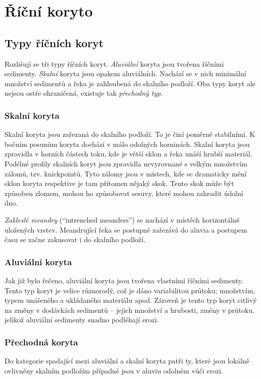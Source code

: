 \section{Říční koryto}
\subsection{Typy říčních koryt}
Rozlišují se tři typy říčních koryt. \emph{Aluviální} koryta jsou tvořena říčními sedimenty. \emph{Skalní} koryta jsou opakem aluviálních. Nachází se v nich minimální množství sedimentů a řeka je zahloubená do skalního podloží. Oba typy koryt ale nejsou ostře ohraničená, existuje tak \emph{přechodný typ}. 

\subsubsection{Skalní koryta}
Skalní koryta jsou  zařezaná do skalního podloží. To je činí poměrně stabilními. K bočním posunům koryta dochází v málo odolných horninách. Skalní koryta jsou zpravidla v horních částech toku, kde je větší sklon a řeka unáší hrubší materiál. Podélné profily skalních koryt jsou zpravidla nevyrovnané s velkým množstvím zálomů, tzv. knickpointů. Tyto zálomy jsou v místech, kde se dramaticky mění sklon koryta respektive je tam přítomen nějaký skok. Tento skok může být způsoben zlomem, mohou ho způsobovat sesuvy, které mohou zahradit údolní dno. 

\emph{Zakleslé meandry} (\enquote{intrenched meanders}) se nachází v místěch horizontálně uložených vrstev. Meandrující řeka se postupně zařezává do aluvia a postupem času se začne zakusovat i do skalního podloží. 

\subsubsection{Aluviální koryta}
Jak již bylo řečeno, aluviální koryta jsou tvořena vlastními říčními sedimenty. Tento typ koryt je velice různorodý, což je dáno variabilitou průtoku; množstvím, typem unášeného a ukládaného materiálu apod. Zároveň je tento typ koryt citlivý na změny v dodávkách sedimentů -- jejich množství a hrubosti, změny v průtoku, jelikož aluviální sedimenty snadno podléhají erozi. 

\subsubsection{Přechodná koryta}
Do kategorie spadající mezi aluviální a skalní koryta patři ty, které jsou lokálně ovlivněny skalním podložím případně jsou v aluviu odolném vůči erozi.

